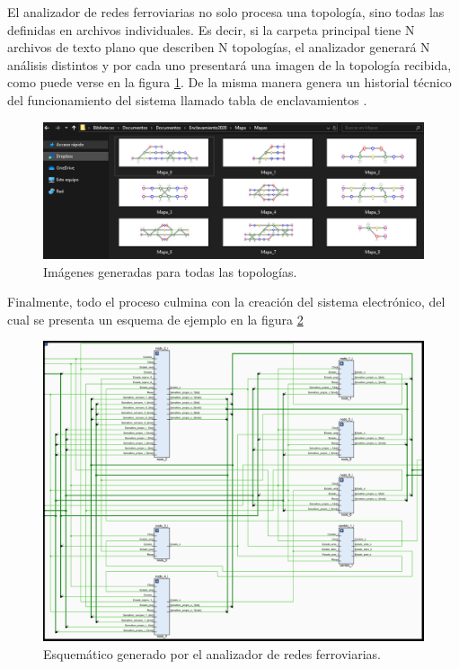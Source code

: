 		El analizador de redes ferroviarias no solo procesa una topología, sino todas las definidas en archivos individuales. Es decir, si la carpeta principal tiene N archivos de texto plano que describen N topologías, el analizador generará N análisis distintos y por cada uno presentará una imagen de la topología recibida, como puede verse en la figura \ref{fig:Topologias}. De la misma manera genera un historial técnico del funcionamiento del sistema llamado tabla de enclavamientos \cite{cite21,cite22}.
		
		\begin{figure}[htbp!]
			\centering
			\includegraphics[scale=.5]{./Figures/Topologias}
			\caption{Imágenes generadas para todas las topologías.}
			\label{fig:Topologias}
		\end{figure}
		
		Finalmente, todo el proceso culmina con la creación del	sistema electrónico, del cual se presenta un esquema de ejemplo en la figura \ref{fig:Esquematico}
		
		\begin{figure}[htbp!]
			\centering
			\includegraphics[scale=.45]{./Figures/Esquematico}
			\caption{Esquemático generado por el analizador de redes ferroviarias.}
			\label{fig:Esquematico}
		\end{figure}
		
